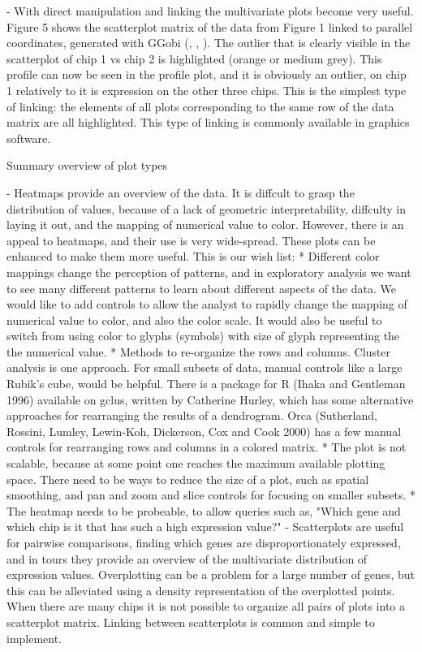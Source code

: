 \documentclass[11pt,a4paper,oldfontcommands,openany]{memoir}
\numberwithin{equation}{section} %
\begin{document}
- With direct manipulation and linking the multivariate plots become very useful. Figure 5 shows the scatterplot matrix of the data from Figure 1 linked to parallel coordinates, generated with GGobi (\citealt{ggobi}, \citealt{ggobi2}, \citealt{ggobi3}). The outlier that is clearly visible in the scatterplot of chip 1 vs chip 2 is highlighted (orange or medium grey). This profile can now be seen in the profile plot, and it is obviously an outlier, on chip 1 relatively to it is expression on the other three chips. This is the simplest type of linking: the elements of all plots corresponding to the same row of the data matrix are all highlighted. This type of linking is commonly available in graphics software.

Summary overview of plot types

- Heatmaps provide an overview of the data. It is diffcult to grasp the distribution of values, because of a lack of geometric interpretability, diffculty in laying it out, and the mapping of numerical value to color. However, there is an appeal to heatmaps, and their use is very wide-spread. These plots can be enhanced to make them more useful. This is our wish list:
* Different color mappings change the perception of patterns, and in exploratory analysis we want to see many different patterns to learn about different aspects of the data. We would like to add controls to allow the analyst to rapidly change the mapping of numerical value to color, and also the color scale. It would also be useful to switch from using color to glyphs (symbols) with size of glyph representing the the numerical value.
* Methods to re-organize the rows and columns. Cluster analysis is one approach. For small subsets of data, manual controls like a large Rubik's cube, would be helpful. There is a package for R (Ihaka and Gentleman 1996) available on gclus, written by Catherine Hurley, which has some alternative approaches for rearranging the results of a dendrogram. Orca (Sutherland, Rossini, Lumley, Lewin-Koh, Dickerson, Cox and Cook 2000) has a few manual controls for rearranging rows and columns in a colored matrix.
* The plot is not scalable, because at some point one reaches the maximum available plotting space. There need to be ways to reduce the size of a plot, such as spatial smoothing, and pan and zoom and slice controls for focusing on smaller subsets.
* The heatmap needs to be probeable, to allow queries such as, "Which gene and which chip is it that has such a high expression value?"
- Scatterplots are useful for pairwise comparisons, finding which genes are disproportionately expressed, and in tours they provide an overview of the multivariate distribution of expression values. Overplotting can be a problem for a large number of genes, but this can be alleviated using a density representation of the overplotted points. When there are many chips it is not possible to organize all pairs of plots into a scatterplot matrix. Linking between scatterplots is common and simple to implement.
\end{document}
